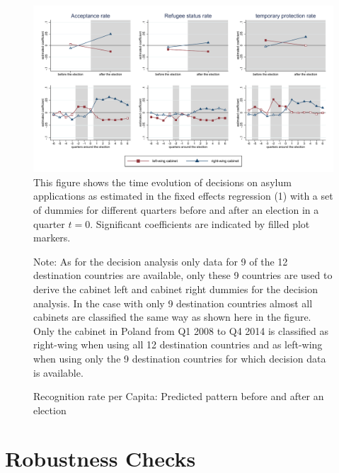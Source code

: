 \documentclass[a4paper,12pt]{article}
\begin{document}
\begin{figure}
	\begin{center}
    \caption{Recognition rate per Capita: Predicted pattern before and after an election}
	\includegraphics[width=1\textwidth]{inputs/dec_graphs_baseline.pdf}
	      {\footnotesize This figure shows the time evolution of decisions on asylum applications as estimated in the fixed effects regression (1) with a set of dummies for different quarters before and after an election in a quarter $t=0$. Significant coefficients are indicated by filled plot markers.}\\
\end{center}
\scriptsize{Note: As for the decision analysis only data for 9 of the 12 destination countries are available, only these 9 countries are used to derive the cabinet left and cabinet right dummies for the decision analysis. In the case with only 9 destination countries almost all cabinets are classified the same way as shown here in the figure. Only the cabinet in Poland from Q1 2008 to Q4 2014 is classified as right-wing when using all 12 destination countries and as left-wing when using only the 9 destination countries for which decision data is available.} 
\label{main_results_quarters}
\end{figure}



\section{Robustness Checks}\label{sec:robustness}

\end{document}

